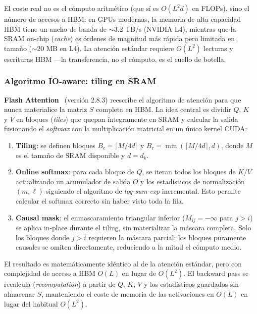El coste real no es el cómputo aritmético (que sí es $O(L^2 d)$ en FLOPs), sino el número de accesos a HBM: en GPUs modernas, la memoria de alta capacidad HBM tiene un ancho de banda de $\sim$3.2 TB/s (NVIDIA L4), mientras que la SRAM on-chip (\textit{cache}) es órdenes de magnitud más rápida pero limitada en tamaño ($\sim$20 MB en L4). La atención estándar requiere $O(L^2)$ lecturas y escrituras HBM —la transferencia, no el cómputo, es el cuello de botella.

\subsubsection{Algoritmo IO-aware: tiling en SRAM}

\textbf{Flash Attention}~\cite{dao2022flashattention} (versión 2.8.3) reescribe el algoritmo de atención para que nunca materialice la matriz $S$ completa en HBM. La idea central es dividir $Q$, $K$ y $V$ en bloques (\textit{tiles}) que quepan íntegramente en SRAM y calcular la salida fusionando el \textit{softmax} con la multiplicación matricial en un único kernel CUDA:

\begin{enumerate}
    \item \textbf{Tiling}: se definen bloques $B_c = \lceil M / 4d \rceil$ y $B_r = \min(\lceil M / 4d \rceil, d)$, donde $M$ es el tamaño de SRAM disponible y $d = d_k$.
    \item \textbf{Online softmax}: para cada bloque de $Q$, se iteran todos los bloques de $K/V$ actualizando un acumulador de salida $O$ y los estadísticos de normalización $(m, \ell)$ siguiendo el algoritmo de \textit{log-sum-exp} incremental. Esto permite calcular el softmax correcto sin haber visto toda la fila.
    \item \textbf{Causal mask}: el enmascaramiento triangular inferior ($M_{ij} = -\infty$ para $j > i$) se aplica in-place durante el tiling, sin materializar la máscara completa. Solo los bloques donde $j > i$ requieren la máscara parcial; los bloques puramente causales se omiten directamente, reduciendo a la mitad el cómputo medio.
\end{enumerate}

El resultado es matemáticamente idéntico al de la atención estándar, pero con complejidad de acceso a HBM $O(L)$ en lugar de $O(L^2)$. El backward pass se recalcula (\textit{recomputation}) a partir de $Q$, $K$, $V$ y los estadísticos guardados sin almacenar $S$, manteniendo el coste de memoria de las activaciones en $O(L)$ en lugar del habitual $O(L^2)$.

